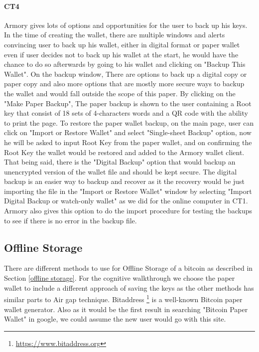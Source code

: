 \paragraph{CT4} 
Armory gives lots of options and opportunities for the user to back up his keys. In the time of creating the wallet, there are multiple windows and alerts convincing user to back up his wallet, either in digital format or paper wallet even if user decides not to back up his wallet at the start, he would have the chance to do so afterwards by going to his wallet and clicking on "Backup This Wallet". On the backup window, There are options to back up a digital copy or paper copy and also more options that are mostly more secure ways to backup the wallet and would fall outside the scope of this paper. By clicking on the "Make Paper Backup", The paper backup is shown to the user containing a Root key that consist of 18 sets of 4-characters words and a QR code with the ability to print the page. To restore the paper wallet backup, on the main page, user can click on "Import or Restore Wallet" and select "Single-sheet Backup" option, now he will be asked to input Root Key from the paper wallet, and on confirming the Root Key the wallet would be restored and added to the Armory wallet client. That being said, there is the "Digital Backup" option that would backup an unencrypted version of the wallet file and should be kept secure. The digital backup is an easier way to backup and recover as it the recovery would be just importing the file in the "Import or Restore Wallet" window by selecting "Import Digital Backup or watch-only wallet" as we did for the online computer in CT1. Armory also gives this option to do the import procedure for testing the backups to see if there is no error in the backup file.



\subsection{Offline Storage}
There are different methods to use for Offline Storage of a bitcoin as described in Section \ref{offline storage}. For the cognitive walkthrough we choose the paper wallet to include a different approach of saving the keys as the other methods has similar parts to Air gap technique. Bitaddress \footnote{\url{https://www.bitaddress.org}} is a well-known Bitcoin paper wallet generator. Also as it would be the first result in searching "Bitcoin Paper Wallet" in google, we could assume the new user would go with this site.\\

